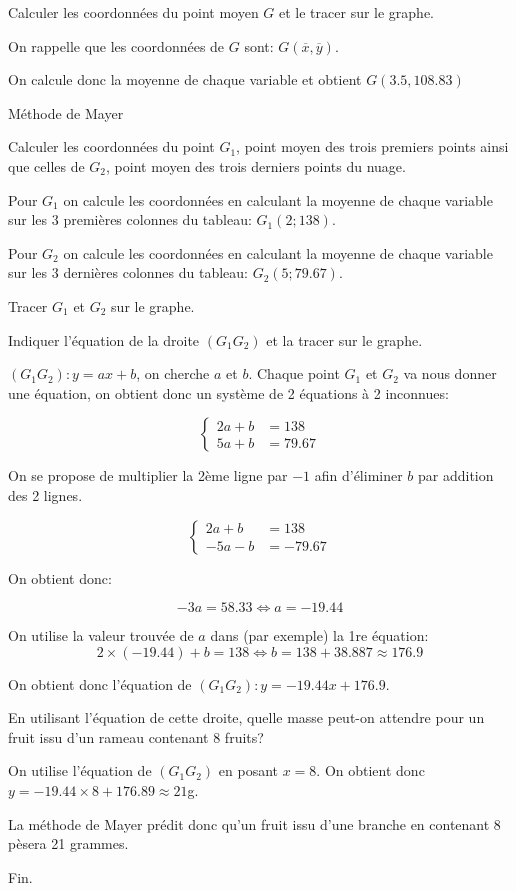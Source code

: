 \documentclass[a4paper,12pt]{scrartcl}
\begin{document}
\question{}
Calculer les coordonnées du point moyen $G$ et le tracer sur le graphe.

On rappelle que les coordonnées de $G$ sont: $G(\overline{x},\overline{y})$.

On calcule donc la moyenne de chaque variable et obtient $G(3.5,108.83)$

\question{}
Méthode de Mayer

\subquestion{}
Calculer les coordonnées du point $G_1$, point moyen des trois premiers points ainsi que celles de $G_2$, point moyen des trois derniers points du nuage. 

Pour $G_1$ on calcule les coordonnées en calculant la moyenne de chaque variable sur les 3 premières colonnes du tableau: $G_1(2;138)$.

Pour $G_2$ on calcule les coordonnées en calculant la moyenne de chaque variable sur les 3 dernières colonnes du tableau: $G_2(5;79.67)$.

\subquestion{}
Tracer $G_1$ et $G_2$ sur le graphe.

\subquestion{}
Indiquer l'équation de la droite $(G_1 G_2)$ et la tracer sur le graphe. 

$(G_1 G_2):y=ax+b$, on cherche $a$ et $b$. Chaque point $G_1$ et $G_2$ va nous donner une équation, on obtient donc un système de 2 équations à 2 inconnues:

$$
\begin{cases} 
2 a + b &= 138 \\
5 a + b &= 79.67
\end{cases}
$$

On se propose de multiplier la 2ème ligne par $-1$ afin d'éliminer $b$ par addition des 2 lignes.

$$
\begin{cases} 
2 a + b &= 138 \\
-5 a - b &= -79.67
\end{cases}
$$

On obtient donc:

$$-3a = 58.33 \Leftrightarrow a = -19.44$$

On utilise la valeur trouvée de $a$ dans (par exemple) la 1re équation: $$2 \times (-19.44) + b = 138 \Leftrightarrow b = 138 + 38.887 \approx 176.9$$

On obtient donc l'équation de $(G_1 G_2):y = -19.44 x + 176.9$. 

\subquestion{}
En utilisant l'équation de cette droite, quelle masse peut-on attendre pour un fruit issu d'un rameau contenant 8 fruits?

On utilise l'équation de $(G_1 G_2)$ en posant $x=8$. On obtient donc $y = -19.44 \times 8 + 176.89 \approx 21$g.

La méthode de Mayer prédit donc qu'un fruit issu d'une branche en contenant 8 pèsera 21 grammes.

\trait

\begin{center}
Fin.
\end{center}
\end{document}
